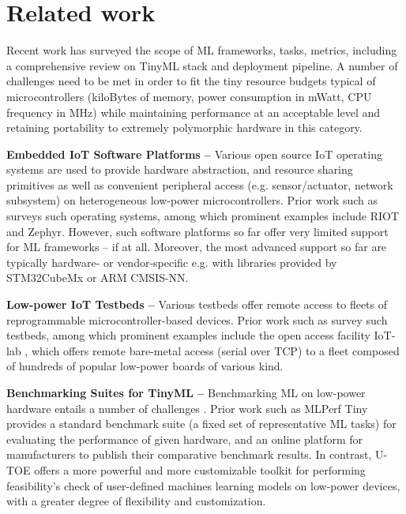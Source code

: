 \section{Related work}
Recent work has surveyed \cite{saha2022tinyml-review} the scope of ML frameworks, tasks, metrics, including a comprehensive review on TinyML stack and deployment pipeline. A number of challenges need to be met in order to fit the tiny resource budgets typical of microcontrollers (kiloBytes of memory, power consumption in mWatt, CPU frequency in MHz) while maintaining performance at an acceptable level and retaining portability to extremely polymorphic hardware in this category.

{\bf Embedded IoT Software Platforms --}
Various open source IoT operating systems are used to provide hardware abstraction, and resource sharing primitives as well as convenient peripheral access (e.g. sensor/actuator, network subsystem) on heterogeneous low-power microcontrollers. Prior work such as \cite{hahm2015operating} surveys such operating systems, among which prominent examples include RIOT\cite{baccelli2018riot} and Zephyr\cite{zephyr}. However, such software platforms so far offer very limited support for ML frameworks -- if at all. Moreover, the most advanced support so far are typically hardware- or vendor-specific e.g. with libraries provided by STM32CubeMx or ARM CMSIS-NN.

{\bf Low-power IoT Testbeds --}
Various testbeds offer remote access to fleets of reprogrammable microcontroller-based devices. Prior work such as \cite{lima2019testbeds,mitton2011testbeds} survey such testbeds, among which prominent examples include the open access facility IoT-lab \cite{adjih2015iot-lab}, which offers remote bare-metal access (serial over TCP) to a fleet composed of hundreds of popular low-power boards of various kind.
 
{\bf Benchmarking Suites for TinyML --}
Benchmarking ML on low-power hardware entails a number of challenges \cite{banbury2020benchmarking}. Prior work such as MLPerf Tiny \cite{banbury2021mlperf} provides a standard benchmark suite (a fixed set of representative ML tasks) for evaluating the performance of given hardware, and an online platform for manufacturers to publish their comparative benchmark results. 
In contrast, U-TOE offers a more powerful and more customizable toolkit for performing feasibility's check of user-defined machines learning models on low-power devices, with a greater degree of flexibility and customization.
 
